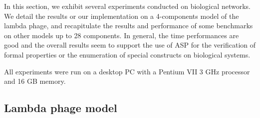 
In this section, we exhibit several experiments conducted on biological networks.
We detail the results or our implementation
on a 4-components model of the lambda phage,
and recapitulate the results and performance of some benchmarks
on other models up to 28 components.
In general, the time performances are good and
the overall results seem to support the use of ASP for the verification
of formal properties or the enumeration of special constructs
on biological systems.

All experiments were run on a desktop PC
with a Pentium VII 3 GHz processor and 16 GB memory.

\subsection{Lambda phage model}
